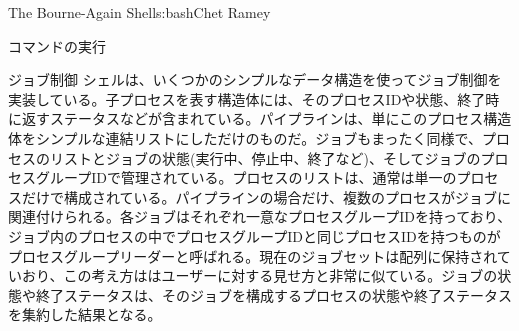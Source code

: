 \begin{aosachapter}{The Bourne-Again Shell}{s:bash}{Chet Ramey}
\begin{aosasect1}{コマンドの実行}
\begin{aosasect2}{ジョブ制御}
シェルは、いくつかのシンプルなデータ構造を使ってジョブ制御を実装している。子プロセスを表す構造体には、そのプロセスIDや状態、終了時に返すステータスなどが含まれている。パイプラインは、単にこのプロセス構造体をシンプルな連結リストにしただけのものだ。ジョブもまったく同様で、プロセスのリストとジョブの状態(実行中、停止中、終了など)、そしてジョブのプロセスグループIDで管理されている。プロセスのリストは、通常は単一のプロセスだけで構成されている。パイプラインの場合だけ、複数のプロセスがジョブに関連付けられる。各ジョブはそれぞれ一意なプロセスグループIDを持っており、ジョブ内のプロセスの中でプロセスグループIDと同じプロセスIDを持つものがプロセスグループリーダーと呼ばれる。現在のジョブセットは配列に保持されていおり、この考え方ははユーザーに対する見せ方と非常に似ている。ジョブの状態や終了ステータスは、そのジョブを構成するプロセスの状態や終了ステータスを集約した結果となる。


\end{aosasect2}
\end{aosasect1}
\end{aosachapter}
